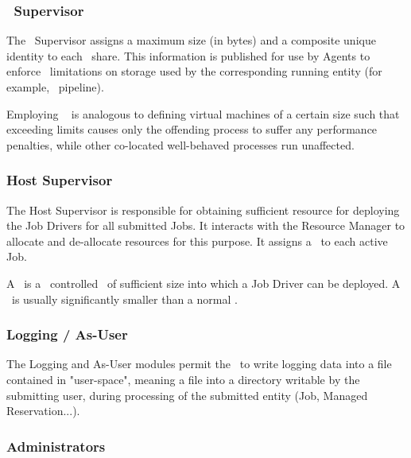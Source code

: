 \begin{itemize}
\begin{description}
    \end{description} 
    
    \subsubsection{\varLinuxControlGroup~Supervisor}  
    
    The \varLinuxControlGroup~Supervisor assigns a maximum size (in bytes) and a composite
    unique identity to each \varDUCC~share. This information is published for use
    by Agents to enforce \varLinuxControlGroup~limitations on storage used by the corresponding
    running entity (for example, \varUIMA~pipeline).
    
    Employing \varLinuxControlGroups~ is analogous to defining virtual machines of a certain
    size such that exceeding limits causes only the offending process to suffer
    any performance penalties, while other co-located well-behaved processes
    run unaffected.
    
    \subsubsection{Host Supervisor}
    
    The Host Supervisor is responsible for obtaining sufficient resource for
    deploying the Job Drivers for all submitted Jobs. It interacts with the
    Resource Manager to allocate and de-allocate resources for this purpose.
    It assigns a \varJdShare~to each active Job.
    
    A \varJdShare~is a \varLinuxControlGroup~controlled \varShare~of sufficient size into which a Job
    Driver can be deployed.  A \varJdShare~is usually significantly smaller than
    a normal \varShare.
    
    \subsubsection{Logging / As-User} 
    
    The Logging and As-User modules permit the \varOrchestrator~to write logging data into
    a file contained in "user-space", meaning a file into a directory writable 
    by the submitting user, during processing of the submitted entity 
    (Job, Managed Reservation...).
        
    \subsubsection{Administrators} 
    

\end{itemize}
